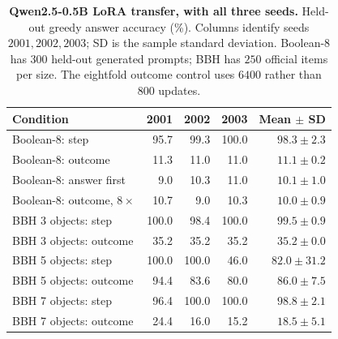 \begin{table}[t]
\centering\small
\caption{\textbf{Qwen2.5-0.5B LoRA transfer, with all three seeds.} Held-out greedy answer accuracy (\%). Columns identify seeds $2001,2002,2003$; SD is the sample standard deviation. Boolean-8 has $300$ held-out generated prompts; BBH has $250$ official items per size. The eightfold outcome control uses $6400$ rather than $800$ updates.}
\label{tab:transfer}
\begin{tabular}{@{}lrrrr@{}}
\toprule
Condition & 2001 & 2002 & 2003 & Mean $\pm$ SD\\
\midrule
Boolean-8: step & 95.7 & 99.3 & 100.0 & $98.3\pm2.3$\\
Boolean-8: outcome & 11.3 & 11.0 & 11.0 & $11.1\pm0.2$\\
Boolean-8: answer first & 9.0 & 10.3 & 11.0 & $10.1\pm1.0$\\
Boolean-8: outcome, $8\times$ & 10.7 & 9.0 & 10.3 & $10.0\pm0.9$\\
BBH 3 objects: step & 100.0 & 98.4 & 100.0 & $99.5\pm0.9$\\
BBH 3 objects: outcome & 35.2 & 35.2 & 35.2 & $35.2\pm0.0$\\
BBH 5 objects: step & 100.0 & 100.0 & 46.0 & $82.0\pm31.2$\\
BBH 5 objects: outcome & 94.4 & 83.6 & 80.0 & $86.0\pm7.5$\\
BBH 7 objects: step & 96.4 & 100.0 & 100.0 & $98.8\pm2.1$\\
BBH 7 objects: outcome & 24.4 & 16.0 & 15.2 & $18.5\pm5.1$\\
\bottomrule
\end{tabular}
\end{table}
